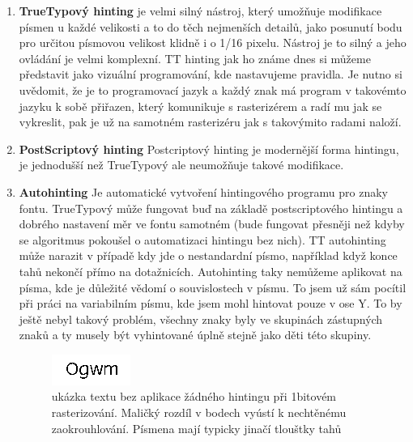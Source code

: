 \documentclass[a4paper]{article}
\begin{document}
\begin{enumerate}
\item \textbf{TrueTypový hinting}
je velmi silný nástroj, který umožňuje modifikace písmen u každé velikosti a to do těch nejmenších detailů, jako posunutí bodu pro určitou písmovou velikost klidně i o 1/16 pixelu. Nástroj je to silný a jeho ovládání je velmi komplexní. TT hinting jak ho známe dnes si můžeme představit jako vizuální programování, kde nastavujeme pravidla. Je nutno si uvědomit, že je to programovací jazyk a každý znak má program v takovémto jazyku k sobě přiřazen, který komunikuje s rasterizérem a radí mu jak se vykreslit, pak je už na samotném rasterizéru jak s takovýmito radami naloží.

\item \textbf{PostScriptový hinting}
Postcriptový hinting je modernější forma hintingu, je jednodušší než TrueTypový ale neumožňuje takové modifikace.

\item \textbf{Autohinting}
Je automatické vytvoření hintingového programu pro znaky fontu. TrueTypový může fungovat buď na základě postscriptového hintingu a dobrého nastavení měr ve fontu samotném (bude fungovat přesněji než kdyby se algoritmus pokoušel o automatizaci hintingu bez nich). TT autohinting může narazit v případě kdy jde o nestandardní písmo, například když konce tahů nekončí přímo na dotažnicích. Autohinting taky nemůžeme aplikovat na písma, kde je důležité vědomí o souvislostech v písmu. To jsem už sám pocítil při práci na variabilním písmu, kde jsem mohl hintovat pouze v ose Y. To by ještě nebyl takový problém, všechny znaky byly ve skupinách zástupných znaků a ty musely být vyhintované úplně stejně jako děti této skupiny.

\begin{figure}[H]
  \includegraphics[width=\linewidth]{pics/no_hinting.png}
  \caption{ukázka textu bez aplikace žádného hintingu při 1bitovém rasterizování. Maličký rozdíl v bodech vyústí k nechtěnému zaokrouhlování. Písmena mají typicky jinačí tlouštky tahů }
\end{figure}


\end{enumerate}
\end{document}
